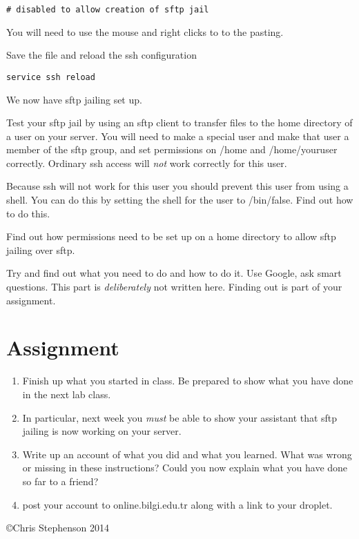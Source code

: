 \documentclass[12pt, a4paper]{article}
\begin{document}
\begin{verbatim}
# disabled to allow creation of sftp jail 
\end{verbatim}

You will need to use the mouse and right clicks to to the pasting.

Save the file and reload the ssh configuration

\begin{verbatim}
service ssh reload
\end{verbatim}

We now have sftp jailing set up. 

Test your sftp jail by using an sftp client to transfer files to the home directory of a user on your server. You will need to make a special user and make that user a member of the sftp group, and set permissions on /home and /home/youruser correctly. Ordinary ssh access will \emph{not} work correctly for this user.

Because ssh will not work for this user you should prevent this user from using a shell. You can do this by setting the shell for the user to /bin/false. Find out how to do this.

Find out how permissions need to be set up on a home directory to allow sftp jailing over sftp.


Try and find out what you need to do and how to do it. Use Google, ask smart questions. This part is \emph{deliberately} not written here. Finding out is part of your assignment.




\section*{Assignment}


\begin{enumerate}
\item Finish up what you started in class. Be prepared to show what you have done in the next lab class. 
\item In particular, next week you \emph{must} be able to show your assistant that sftp jailing is now working on your server.
\item Write up an account of what you did and what you learned. What was wrong or missing in these instructions? Could you now explain what you have done so far to a friend?
\item post your account to online.bilgi.edu.tr along with a link to your droplet.

\end{enumerate}

\copyright Chris Stephenson 2014
\end{document}
